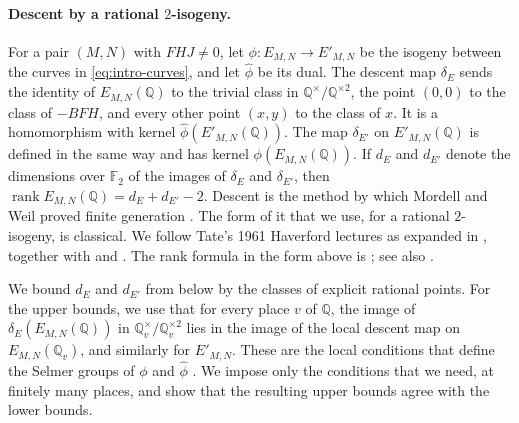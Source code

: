 \documentclass[12pt,oneside,openany]{book}
\theoremstyle{definition}
\theoremstyle{plain}
\numberwithin{equation}{chapter}
\theoremstyle{plain}
\theoremstyle{definition}
\theoremstyle{remark}
\newcommand{\Q}{\mathbb Q}
\newcommand{\F}{\mathbb F}
\DeclareMathOperator{\rk}{rank}
\newcommand{\sqgp}[1]{#1^{\times}/#1^{\times2}}
\newcommand{\dual}{\hat\phi}
\begin{document}
\paragraph{Descent by a rational $2$-isogeny.} For a pair $(M,N)$ with $FHJ\ne0$, let $\phi\colon E_{M,N}\to E'_{M,N}$ be the isogeny between the curves in \eqref{eq:intro-curves}, and let $\dual$ be its dual. The descent map $\delta_E$ sends the identity of $E_{M,N}(\Q)$ to the trivial class in $\sqgp{\Q}$, the point $(0,0)$ to the class of $-BFH$, and every other point $(x,y)$ to the class of $x$. It is a homomorphism with kernel $\dual(E'_{M,N}(\Q))$. The map $\delta_{E'}$ on $E'_{M,N}(\Q)$ is defined in the same way and has kernel $\phi(E_{M,N}(\Q))$. If $d_E$ and $d_{E'}$ denote the dimensions over $\F_2$ of the images of $\delta_E$ and $\delta_{E'}$, then $\rk E_{M,N}(\Q)=d_E+d_{E'}-2$. Descent is the method by which Mordell and Weil proved finite generation \cite{Mordell1922,Weil1929}. The form of it that we use, for a rational $2$-isogeny, is classical. We follow Tate's 1961 Haverford lectures as expanded in \cite[\S\S3.4--3.6]{SilvermanTate2015}, together with \cite[Example~X.4.8 and Proposition~X.4.9]{SilvermanAEC} and \cite[\S14]{Cassels1991}. The rank formula in the form above is \cite[Lemma~3.1]{Zywina2026}; see also \cite[\S3.6]{SilvermanTate2015}.

We bound $d_E$ and $d_{E'}$ from below by the classes of explicit rational points. For the upper bounds, we use that for every place $v$ of $\Q$, the image of $\delta_E(E_{M,N}(\Q))$ in $\sqgp{\Q_v}$ lies in the image of the local descent map on $E_{M,N}(\Q_v)$, and similarly for $E'_{M,N}$. These are the local conditions that define the Selmer groups of $\phi$ and $\dual$ \cite[\S X.4]{SilvermanAEC}. We impose only the conditions that we need, at finitely many places, and show that the resulting upper bounds agree with the lower bounds.
\end{document}
